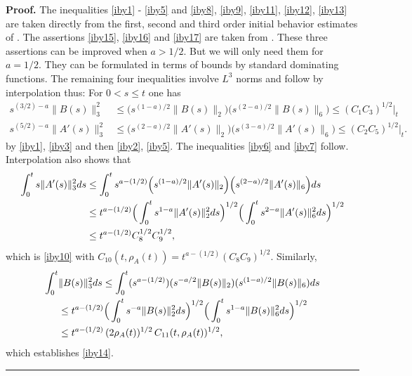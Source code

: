 \documentclass[12pt]{article}
\newenvironment{proof}[1][Proof]{\textbf{#1.} }{\ \rule{0.5em}{0.5em}}
\def \({\Big(}
\def \){\Big)}
\def \eref{\eqref}
\numberwithin{equation}{section}
\begin{document}
          \begin{proof} The inequalities \eref{iby1} - \eref{iby5} and \eref{iby8}, \eref{iby9}, \eref{iby11},
          \eref{iby12}, \eref{iby13} are taken directly
    from the first, second and third order initial behavior estimates of \cite[Section 7.2]{G70}.
    The assertions \eref{iby15}, \eref{iby16} and \eref{iby17} are taken from \cite[Proposition 7.19]{G70}.
    These three assertions can be improved when $a > 1/2$. But we will only need them for $a = 1/2$.
    They can be formulated in terms of  bounds by standard dominating functions.
    The  remaining four inequalities involve $L^3$ norms and follow by interpolation thus:
    For $0 < s \le t$ one has
    \begin{align*}
    s^{(3/2) - a} \|B(s)\|_3^2 &\le \Big(s^{(1-a)/2} \|B(s)\|_2\Big) 
                            \Big(s^{(2-a)/2} \|B(s)\|_6\Big) \le (C_1 C_3)^{1/2}|_t\\
    s^{(5/2) - a} \|A'(s)\|_3^2 &\le \Big( s^{(2-a)/2} \|A'(s)\|_2 \Big) \Big( s^{(3-a)/2} \|A'(s)\|_6\Big) 
    \le (C_2 C_5)^{1/2}|_t.
    \end{align*}
    by \eref{iby1}, \eref{iby3} and then \eref{iby2}, \eref{iby5}.
  The inequalities \eref{iby6} and \eref{iby7} follow.
     Interpolation also shows that 
    \begin{align}
 \int_0^t s \|A'(s)\|_3^2 ds &\le \int_0^t s^{a- (1/2)} \(s^{(1-a)/2} \|A'(s)\|_2\) \( s^{(2-a)/2} \|A'(s)\|_6\) ds \notag\\
 &\le t^{a - (1/2)} \(\int_0^t s^{1-a} \|A'(s)\|_2^2 ds \)^{1/2} \( \int_0^t s^{2-a} \|A'(s)\|_6^2 ds \)^{1/2}\notag\\
 &\le t^{a - (1/2)} C_8^{1/2} C_9^{1/2},              \label{ibA42a}
\end{align}  
which is \eref{iby10} with $C_{10}(t, \rho_A(t)) = t^{a - (1/2)} (C_8 C_9)^{1/2}$.
    Similarly,  
  \begin{align}
    \int_0^t &\|B(s)\|_3^2 ds \le \int_0^t(s^{a- (1/2)})(s^{-a/2} \|B(s)\|_2) (s^{(1-a)/2} \|B(s)\|_6)ds    \notag \\
    &\le t^{a - (1/2)} \Big( \int_0^t s^{-a} \|B(s)\|_2^2 ds \Big)^{1/2}
     \Big( \int_0^t s^{1-a} \|B(s)\|_6^2 ds \Big)^{1/2}  \notag \\
     &\le   t^{a - (1/2)}\, (2\rho_A(t))^{1/2}\, C_{11}(t, \rho_A(t))^{1/2},       \label{rec848e}
     \end{align}   
     which establishes \eref{iby14}.
   \end{proof}
   
\end{document}
